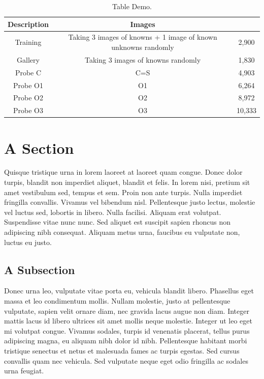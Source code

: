 \begin{table}[]
\caption{Table Demo.\label{table.demo1}}
\begin{tabular}{|c|c|c|}
\hline
Description & Images &  \\ \hline
Training & Taking 3 images of knowns + 1 image of known unknowns randomly & 2,900 \\ \hline
Gallery & Taking 3 images of knowns randomly & 1,830 \\ \hline
Probe C & C=S & 4,903 \\ \hline
Probe O1 & O1 & 6,264 \\ \hline
Probe O2 & O2 & 8,972 \\ \hline
Probe O3 & O3 & 10,333 \\ \hline
\end{tabular}
\end{table}

\section{A Section}

Quisque tristique urna in lorem laoreet at laoreet quam congue. Donec dolor turpis, blandit non imperdiet aliquet, blandit et felis. In lorem nisi, pretium sit amet vestibulum sed, tempus et sem. Proin non ante turpis. Nulla imperdiet fringilla convallis. Vivamus vel bibendum nisl. Pellentesque justo lectus, molestie vel luctus sed, lobortis in libero. Nulla facilisi. Aliquam erat volutpat. Suspendisse vitae nunc nunc. Sed aliquet est suscipit sapien rhoncus non adipiscing nibh consequat. Aliquam metus urna, faucibus eu vulputate non, luctus eu justo.

\subsection{A Subsection}

Donec urna leo, vulputate vitae porta eu, vehicula blandit libero. Phasellus eget massa et leo condimentum mollis. Nullam molestie, justo at pellentesque vulputate, sapien velit ornare diam, nec gravida lacus augue non diam. Integer mattis lacus id libero ultrices sit amet mollis neque molestie. Integer ut leo eget mi volutpat congue. Vivamus sodales, turpis id venenatis placerat, tellus purus adipiscing magna, eu aliquam nibh dolor id nibh. Pellentesque habitant morbi tristique senectus et netus et malesuada fames ac turpis egestas. Sed cursus convallis quam nec vehicula. Sed vulputate neque eget odio fringilla ac sodales urna feugiat.

